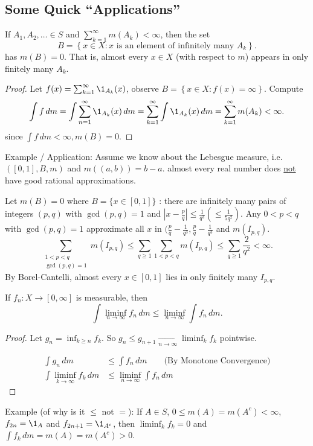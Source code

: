 \subsection{Some Quick ``Applications''}

\begin{theorem}
	If $A_1, A_2, \ldots \in S$ and $\sum_{k = 1}^{\infty} m(A_k) < \infty$, then the set
	\[
		B = \left\{x \in X : x \textrm{ is an element of infinitely many } A_k \right\}.
	\]
	has $m(B) = 0$.
	That is, almost every $x \in X$ (with respect to $m$) appears in only finitely many $A_k$. 
\end{theorem}

\begin{proof}
	Let $f(x) = \sum_{k = 1}^{\infty} \1_{A_k}(x)$, observe $B = \left\{x \in X : f(x) = \infty \right\}$. 
	Compute
	\[
		\int f \, dm = \int \sum_{n = 1}^{\infty} \1_{A_k}(x) \, dm = \sum_{k = 1}^{\infty} \int \1_{A_k}(x) \, dm = \sum_{k = 1}^{\infty} m(A_k) < \infty.
	\]
	since $\int f \, dm < \infty, m(B) = 0$. 
\end{proof}

Example / Application: 
Assume we know about the Lebesgue measure, i.e. $([0,1], B, m)$ and $m((a,b)) = b - a$. 
almost every real number does \underline{not} have good rational approximations. 

\begin{theorem}
	Let $m(B) = 0$ where $B = \{ x \in [0,1] \}$ : there are infinitely many pairs of integers $(p,q)$ with $\gcd (p, q) = 1$ and $\left| x - \frac{p}{q} \right| \leq \frac{1}{q^3} \left( \leq \frac{1}{5q^2} \right)$.
	Any $0 < p < q$ with $\gcd(p,q) = 1$ approximate all $x$ in $(\frac{p}{q} - \frac{1}{q^3}, \frac{p}{q} - \frac{1}{q^3}$ and $m(I_{p,q})$. 
	\[
		\sum_{\substack{1 < p < q \\ \gcd (p, q) = 1}} m(I_{p,q}) \leq \sum_{q \geq 1} \sum_{1 < p < q} m(I_{p, q}) \leq \sum_{q \geq 1}^{} \frac{2}{q^2} < \infty.
	\]
	By Borel-Cantelli, almost every $x \in [0,1]$ lies in only finitely many $I_{p,q}$. 
\end{theorem}

\begin{lemma}
	If $f_n : X \to [0, \infty]$ is measurable, then 
	\[
		\int \liminf_{n \to \infty} f_n \, dm \leq \liminf_{n \to \infty} \int f_n \, dm.
	\]
\end{lemma}

\begin{proof}
	Let $g_n = \inf_{k \geq n} f_k$. So $g_n \leq g_{n+1} \xrightarrow[n \to \infty]{} \liminf_{k} f_k$ pointwise. 

	\begin{align*}
		\int g_n \, dm & \leq \int f_n \, dm \qquad \textrm{(By Monotone Convergence)} \\
		\int \liminf_{k \to \infty} f_k \, dm & \leq \liminf_{n \to \infty} \int f_n \, dm
	\end{align*}
\end{proof}

Example (of why is it $\leq$ not $=$):
If $A \in S$, $0 \leq m(A) = m(A^c) < \infty$, $f_{2n} = \1_A$ and $f_{2n+1} = \1_{A^c}$, then
$\liminf_k f_k = 0$ and $\int f_k \, dm = m(A) = m(A^c) > 0$.
